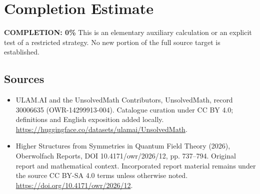 \documentclass[11pt]{article}
\begin{document}
\section{Completion Estimate}
\noindent\textbf{COMPLETION: 0\%}
This is an elementary auxiliary calculation or an explicit test of a restricted strategy. No new portion of the full source target is established.

\subsection{Sources}
\begin{itemize}
\item[\hypertarget{source:30006635:1}{S1}] ULAM.AI and the UnsolvedMath Contributors, UnsolvedMath, record 30006635 (OWR-14299913-004). Catalogue curation under CC BY 4.0; definitions and English exposition added locally.
\url{https://huggingface.co/datasets/ulamai/UnsolvedMath}.
\item[\hypertarget{source:30006635:2}{S2}] Higher Structures from Symmetries in Quantum Field Theory (2026), Oberwolfach Reports, DOI 10.4171/owr/2026/12, pp. 737--794. Original report and mathematical context. Incorporated report material remains under the source CC BY-SA 4.0 terms unless otherwise noted.
\url{https://doi.org/10.4171/owr/2026/12}.
\end{itemize}
\label{end:30006635}
\end{document}
